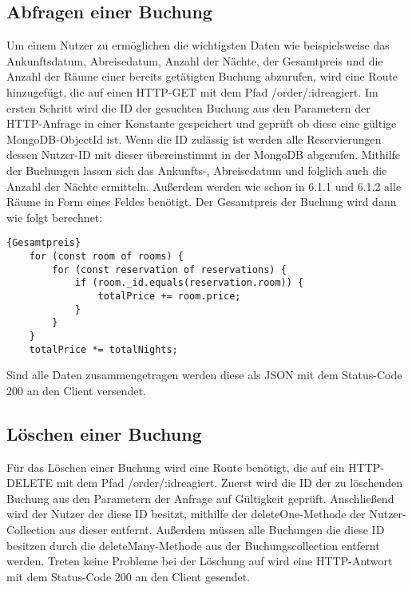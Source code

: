 \subsection{Abfragen einer Buchung}
Um einem Nutzer zu ermöglichen die wichtigsten Daten wie beispielsweise das Ankunftsdatum, Abreisedatum, Anzahl der Nächte, der Gesamtpreis und die Anzahl der Räume einer bereits getätigten Buchung abzurufen, wird eine Route hinzugefügt, die auf einen HTTP-GET mit dem Pfad \glqq /order/:id\grqq \thinspace reagiert. Im ersten Schritt wird die ID der gesuchten Buchung aus den Parametern der HTTP-Anfrage in einer Konstante gespeichert und geprüft ob diese eine gültige MongoDB-ObjectId ist. Wenn die ID zulässig ist werden alle Reservierungen dessen Nutzer-ID mit dieser übereinstimmt in der MongoDB abgerufen. Mithilfe der Buchungen lassen sich das Ankunfts-, Abreisedatum und folglich auch die Anzahl der Nächte ermitteln. Außerdem werden wie schon in 6.1.1 und 6.1.2 alle Räume in Form eines Feldes benötigt. Der Gesamtpreis der Buchung wird dann wie folgt berechnet:
\begin{lstlisting}{Gesamtpreis}
	for (const room of rooms) {
		for (const reservation of reservations) {
			if (room._id.equals(reservation.room)) {
				totalPrice += room.price;
			}
		}
	}
    totalPrice *= totalNights;
\end{lstlisting}
Sind alle Daten zusammengetragen werden diese als JSON mit dem Status-Code 200 an den Client versendet.

\subsection{Löschen einer Buchung}
Für das Löschen einer Buchung wird eine Route benötigt, die auf ein HTTP-DELETE mit dem Pfad \glqq /order/:id\grqq \thickspace reagiert. Zuerst wird die ID der zu löschenden Buchung aus den Parametern der Anfrage auf Gültigkeit geprüft. Anschließend wird der Nutzer der diese ID besitzt, mithilfe der \glqq deleteOne\grqq-Methode der Nutzer-Collection aus dieser entfernt. Außerdem müssen alle Buchungen die diese ID besitzen durch die \glqq deleteMany\grqq-Methode aus der Buchungscollection entfernt werden. Treten keine Probleme bei der Löschung auf wird eine HTTP-Antwort mit dem Status-Code 200 an den Client gesendet.

